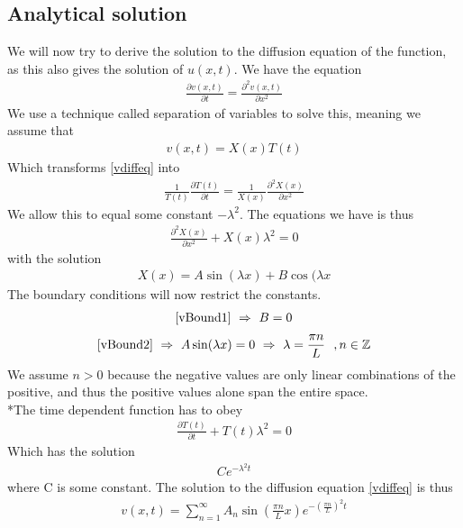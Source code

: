 \documentclass[norsk, a4paper]{article}
\newcommand\lr[1]{\left(#1\right)}
\begin{document}
\subsection{Analytical solution}
We will now try to derive the solution to the diffusion equation of the function, as this also gives the solution of $u(x,t)$.
We have the equation
\begin{align}
\frac{\partial v(x,t)}{\partial t} = \frac{\partial^2 v(x,t)}{\partial x^2}
\label{vdiffeq}
\end{align}
We use a technique called separation of variables to solve this, meaning we assume that 
\begin{align*}
v(x,t) = X(x)T(t)
\end{align*}
Which transforms \eqref{vdiffeq} into
\begin{align*}
\frac{1}{T(t)}\frac{\partial T(t)}{\partial t} = \frac{1}{X(x)}\frac{\partial^2 X(x)}{\partial x^2}
\end{align*}
We allow this to equal some constant $-\lambda^2$. The equations we have is thus
\begin{align*}
\frac{\partial^2 X(x)}{\partial x^2} + X(x)\lambda^2 = 0
\end{align*}
with the solution
\begin{align*}
X(x) = A\sin(\lambda x) + B\cos(\lambda x
\end{align*}
The boundary conditions will now restrict the constants. 
\begin{align*}
\eqref{vBound1} ~\Rightarrow~B=0
\end{align*}
\begin{align*}
\eqref{vBound2} ~\Rightarrow~A\sin(\lambda x) = 0 ~\Rightarrow~\lambda = \frac{\pi n}{L}~~,n \in \mathbb{Z}
\end{align*}
We assume $n>0$ because the negative values are only linear combinations of the positive, and thus the positive values alone span the entire space.
\\*The time dependent function has to obey
\begin{align*}
\frac{\partial T(t)}{\partial t} + T(t)\lambda^2 = 0
\end{align*}
Which has the solution
\begin{align*}
Ce^{-\lambda^2t}
\end{align*}
where C is some constant. The solution to the diffusion equation \eqref{vdiffeq} is thus
\begin{align*}
v(x,t) = \sum_{n=1}^\infty A_n\sin\lr{\frac{\pi n}{L}x}e^{-{\lr{\frac{\pi n}{L}}^2t}} 
\end{align*}
\end{document}
